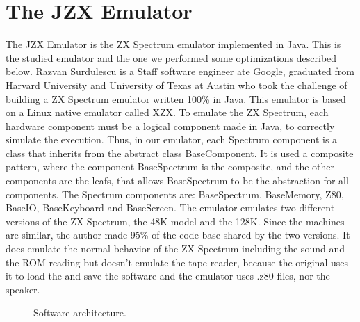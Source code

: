 \section{The JZX Emulator}
The JZX Emulator is the ZX Spectrum emulator implemented in Java. This is the studied emulator and the one we performed some optimizations described below.
Razvan Surdulescu is a Staff software engineer ate Google, graduated from Harvard University and University of Texas at Austin who took the challenge of building a ZX Spectrum emulator written 100\% in Java. This emulator is based on a Linux native emulator called XZX.
To emulate the ZX Spectrum, each hardware component must be a logical component made in Java, to correctly simulate the execution. Thus, in our emulator, each Spectrum component is a class that inherits from the abstract class BaseComponent. It is used a composite pattern, where the component BaseSpectrum is the composite, and the other components are the leafs, that allows BaseSpectrum to be the abstraction for all components. The Spectrum components are: BaseSpectrum, BaseMemory, Z80, BaseIO, BaseKeyboard and  BaseScreen.
The emulator emulates two different versions of the ZX Spectrum, the 48K model and the 128K. Since the machines are similar, the author made 95\% of the code base shared by the two versions.
It does emulate the normal behavior of the ZX Spectrum including the sound and the ROM reading but doesn't emulate the tape reader, because the original uses it to load the and save the software and the emulator uses .z80 files, nor the speaker.
\begin{figure}
	\caption{Software architecture.}
\end{figure}

